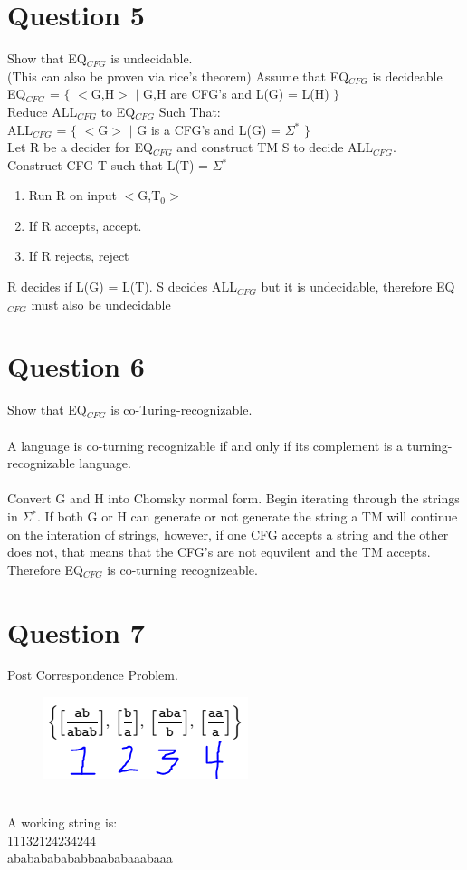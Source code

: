 \documentclass[10pt,a4paper]{article}
\begin{document}
\section*{Question 5}
Show that EQ$_{CFG}$ is undecidable.\\
(This can also be proven via rice's theorem)
Assume that EQ$_{CFG}$ is decideable\\
EQ$_{CFG}$ = $\lbrace$ $<$G,H$>$ $\mid$ G,H are CFG's and L(G) = L(H) $\rbrace$
\\
Reduce ALL$_{CFG}$ to EQ$_{CFG}$ Such That:
\\
ALL$_{CFG}$ = $\lbrace$ $<$G$>$ $\mid$ G is a CFG's and L(G) = $\Sigma$$^{\ast}$ $\rbrace$
\\
Let R be a decider for EQ$_{CFG}$ and construct TM S to decide ALL$_{CFG}$.
\\
Construct CFG T such that L(T) = $\Sigma$$^{\ast}$
\begin{enumerate}
  \item Run R on input $<$G,T$_{0}$$>$
  \item If R accepts, accept.
  \item If R rejects, reject 
\end{enumerate}
R decides if L(G) = L(T). S decides ALL$_{CFG}$ but it is undecidable, therefore EQ$_{CFG}$ must also be undecidable 

\section*{Question 6}
Show that EQ$_{CFG}$ is co-Turing-recognizable.\\\\
A language is co-turning recognizable if and only if its complement is a turning-recognizable language.\\
\\
Convert G and H into Chomsky normal form. Begin iterating through the strings in $\Sigma$$^{\ast}$. If both G or H can generate or not generate the string a TM will continue on the interation of strings, however, if one CFG accepts a string and the other does not, that means that the CFG's are not equvilent and the TM accepts. Therefore EQ$_{CFG}$  is co-turning recognizeable.
\section*{Question 7}
Post Correspondence Problem.\\
	\begin{figure}[h]
		\includegraphics[scale = .5]{338q7.png}
  		\label{fig:PCP}
	\end{figure}
\\
A working string is:\\
11132124234244\\
ababababababbaababaaabaaa
\end{document}
